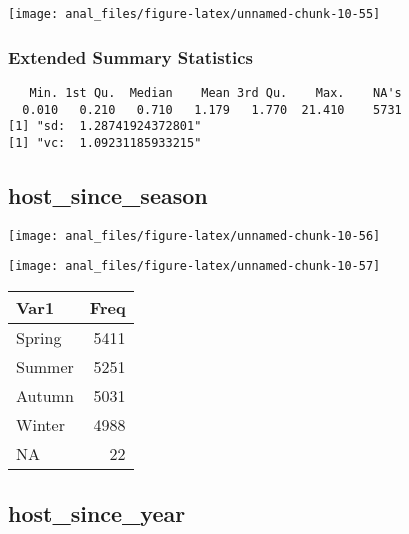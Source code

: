 \begin{center}\texttt{[image: anal\_files/figure-latex/unnamed-chunk-10-55]} \end{center}

\hypertarget{extended-summary-statistics-19}{%
\subsubsection{Extended Summary
Statistics}\label{extended-summary-statistics-19}}

\begin{verbatim}   Min. 1st Qu.  Median    Mean 3rd Qu.    Max.    NA's 
  0.010   0.210   0.710   1.179   1.770  21.410    5731 
[1] "sd:  1.28741924372801"
[1] "vc:  1.09231185933215"
\end{verbatim}

\pagebreak

\hypertarget{host_since_season}{%
\subsection{host\_since\_season}\label{host_since_season}}

\begin{center}\texttt{[image: anal\_files/figure-latex/unnamed-chunk-10-56]} \end{center}

\begin{center}\texttt{[image: anal\_files/figure-latex/unnamed-chunk-10-57]} \end{center}

\begin{table}[H]
\centering
\begin{tabular}[t]{lr}
\toprule
Var1 & Freq\\
\midrule
Spring & 5411\\
Summer & 5251\\
Autumn & 5031\\
Winter & 4988\\
NA & 22\\
\bottomrule
\end{tabular}
\end{table}
\pagebreak

\hypertarget{host_since_year}{%
\subsection{host\_since\_year}\label{host_since_year}}

